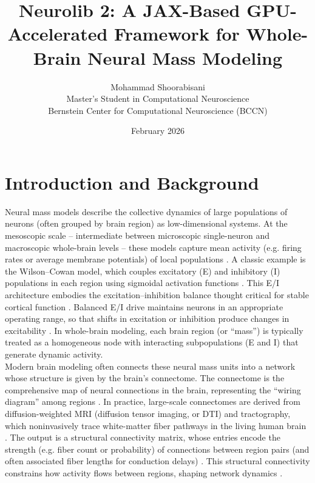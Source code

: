 \documentclass[11pt,a4paper]{article}
\title{Neurolib 2: A JAX-Based GPU-Accelerated Framework for Whole-Brain Neural Mass Modeling}
\author{Mohammad Shoorabisani\\
Master's Student in Computational Neuroscience\\
Bernstein Center for Computational Neuroscience (BCCN)
}
\date{February 2026}
\begin{document}
\maketitle


\section{Introduction and Background}

Neural mass models describe the collective dynamics of large populations of neurons (often grouped by
brain region) as low-dimensional systems. At the mesoscopic scale – intermediate between microscopic
single-neuron and macroscopic whole-brain levels – these models capture mean activity (e.g. firing rates or
average membrane potentials) of local populations \cite{tewarie2021validity}. A classic example is the Wilson–Cowan model,
which couples excitatory (E) and inhibitory (I) populations in each region using sigmoidal activation
functions \cite{wilson1972excitatory,wilson1973dynamics}. This E/I architecture embodies the excitation–inhibition balance thought critical for
stable cortical function \cite{liang2025excitation}. Balanced E/I drive maintains neurons in an appropriate operating range, so that
shifts in excitation or inhibition produce changes in excitability \cite{liang2025excitation}. In whole-brain modeling, each brain
region (or “mass”) is typically treated as a homogeneous node with interacting subpopulations (E and I) that
generate dynamic activity. \\


Modern brain modeling often connects these neural mass units into a network whose structure is given by
the brain’s connectome. The connectome is the comprehensive map of neural connections in the brain,
representing the “wiring diagram” among regions \cite{sporns2005human,hagmann2005diffusion}. In practice, large-scale connectomes are derived
from diffusion-weighted MRI (diffusion tensor imaging, or DTI) and tractography, which noninvasively trace
white-matter fiber pathways in the living human brain \cite{mukherjee2023diffusion}. The output is a structural connectivity
matrix, whose entries encode the strength (e.g. fiber count or probability) of connections between region
pairs (and often associated fiber lengths for conduction delays) \cite{jimenezmarin2024open}. This structural connectivity
constrains how activity flows between regions, shaping network dynamics \cite{honey2007network,deco2009key}. \\
\end{document}
